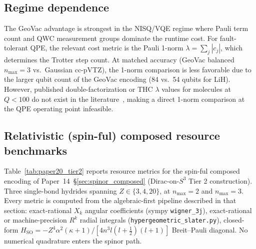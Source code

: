 \documentclass[twocolumn,pra,amsmath,amssymb,superscriptaddress]{revtex4-2}
\begin{document}
\subsection{Regime dependence}

The GeoVac advantage is strongest in the NISQ/VQE regime where Pauli
term count and QWC measurement groups dominate the runtime cost.
For fault-tolerant QPE, the relevant cost metric is the Pauli 1-norm
$\lambda = \sum_j |c_j|$, which determines the Trotter step count.
At matched accuracy (GeoVac balanced $n_{\max}=3$ vs.\ Gaussian
cc-pVTZ), the 1-norm comparison is less favorable due to the larger
qubit count of the GeoVac encoding (84 vs.\ 54 qubits for LiH).
However, published double-factorization or THC $\lambda$ values for
molecules at $Q < 100$ do not exist in the literature~\cite{Lee2021,
vonBurg2021}, making a direct 1-norm comparison at the QPE operating
point infeasible.

\subsection{Relativistic (spin-ful) composed resource benchmarks}
\label{subsec:paper20_tier2}

Table~\ref{tab:paper20_tier2} reports resource metrics for the
spin-ful composed encoding of Paper~14~\S\ref{sec:spinor_composed}
(Dirac-on-$S^3$ Tier 2 construction). Three single-bond hydrides
spanning $Z \in \{3, 4, 20\}$, at $n_{\max} = 2$ and $n_{\max} = 3$.
Every metric is computed from the algebraic-first pipeline described
in that section: exact-rational $X_k$ angular coefficients (sympy
\texttt{wigner\_3j}), exact-rational or machine-precision $R^k$ radial
integrals (\texttt{hypergeometric\_slater.py}), closed-form
$H_{\mathrm{SO}} = -Z^4\alpha^2(\kappa+1)/[4 n^3 l(l+\tfrac{1}{2})(l+1)]$
Breit--Pauli diagonal. No numerical quadrature enters the spinor path.
\end{document}
